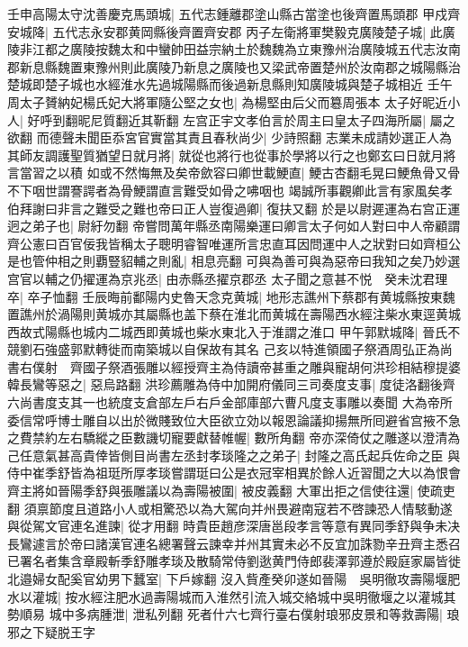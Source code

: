 壬申高陽太守沈善慶克馬頭城|{
	五代志鍾離郡塗山縣古當塗也後齊置馬頭郡}
甲戍齊安城降|{
	五代志永安郡黄岡縣後齊置齊安郡}
丙子左衛將軍樊毅克廣陵楚子城|{
	此廣陵非江都之廣陵按魏太和中蠻帥田益宗納土於魏魏為立東豫州治廣陵城五代志汝南郡新息縣魏置東豫州則此廣陵乃新息之廣陵也又梁武帝置楚州於汝南郡之城陽縣治楚城即楚子城也水經淮水先過城陽縣而後過新息縣則知廣陵城與楚子城相近}
壬午周太子贇納妃楊氏妃大將軍隨公堅之女也|{
	為楊堅由后父而簒周張本}
太子好昵近小人|{
	好呼到翻昵尼質翻近其靳翻}
左宫正宇文孝伯言於周主曰皇太子四海所屬|{
	屬之欲翻}
而德聲未聞臣忝宮官實當其責且春秋尚少|{
	少詩照翻}
志業未成請妙選正人為其師友調護聖質猶望日就月將|{
	就從也將行也從事於學將以行之也鄭玄曰日就月將言當習之以積}
如或不然悔無及矣帝歛容曰卿世載鯁直|{
	鯁古杏翻毛晃曰鯁魚骨又骨不下咽世謂謇諤者為骨鯁謂直言難受如骨之咈咽也}
竭誠所事觀卿此言有家風矣孝伯拜謝曰非言之難受之難也帝曰正人豈復過卿|{
	復扶又翻}
於是以尉遲運為右宫正運迥之弟子也|{
	尉紆勿翻}
帝嘗問萬年縣丞南陽樂運曰卿言太子何如人對曰中人帝顧謂齊公憲曰百官佞我皆稱太子聰明睿智唯運所言忠直耳因問運中人之狀對曰如齊桓公是也管仲相之則覇豎貂輔之則亂|{
	相息亮翻}
可與為善可與為惡帝曰我知之矣乃妙選宫官以輔之仍擢運為京兆丞|{
	由赤縣丞擢京郡丞}
太子聞之意甚不悦　癸未沈君理卒|{
	卒子恤翻}
壬辰晦前鄱陽内史魯天念克黄城|{
	地形志譙州下蔡郡有黄城縣按東魏置譙州於渦陽則黄城亦其屬縣也盖下蔡在淮北而黄城在壽陽西水經注柴水東逕黄城西故式陽縣也城内二城西即黄城也柴水東北入于淮謂之淮口}
甲午郭默城降|{
	晉氏不競劉石強盛郭默轉徙而南築城以自保故有其名}
己亥以特進領國子祭酒周弘正為尚書右僕射　齊國子祭酒張雕以經授齊主為侍讀帝甚重之雕與寵胡何洪珍相結穆提婆韓長鸞等惡之|{
	惡烏路翻}
洪珍薦雕為侍中加開府儀同三司奏度支事|{
	度徒洛翻後齊六尚書度支其一也統度支倉部左戶右戶金部庫部六曹凡度支事雕以奏聞}
大為帝所委信常呼博士雕自以出於微賤致位大臣欲立効以報恩論議抑揚無所囘避省宫掖不急之費禁約左右驕縱之臣數譏切寵要獻替帷幄|{
	數所角翻}
帝亦深倚仗之雕遂以澄清為己任意氣甚高貴倖皆側目尚書左丞封孝琰隆之之弟子|{
	封隆之高氏起兵佐命之臣}
與侍中崔季舒皆為祖珽所厚孝琰嘗謂珽曰公是衣冠宰相異於餘人近習聞之大以為恨會齊主將如晉陽季舒與張雕議以為壽陽被圍|{
	被皮義翻}
大軍出拒之信使往還|{
	使疏吏翻}
須禀節度且道路小人或相驚恐以為大駕向并州畏避南寇若不啓諫恐人情駭動遂與從駕文官連名進諫|{
	從才用翻}
時貴臣趙彦深唐邕段孝言等意有異同季舒與争未决長鸞遽言於帝曰諸漢官連名總署聲云諫幸并州其實未必不反宜加誅勠辛丑齊主悉召已署名者集含章殿斬季舒雕孝琰及散騎常侍劉逖黄門侍郎裴澤郭遵於殿庭家屬皆徙北邉婦女配奚官幼男下蠶室|{
	下戶嫁翻}
沒入貲產癸卯遂如晉陽　吳明徹攻壽陽堰肥水以灌城|{
	按水經注肥水過壽陽城而入淮然引流入城交絡城中吳明徹堰之以灌城其勢順易}
城中多病腫泄|{
	泄私列翻}
死者什六七齊行臺右僕射琅邪皮景和等救壽陽|{
	琅邪之下疑脱王字}
